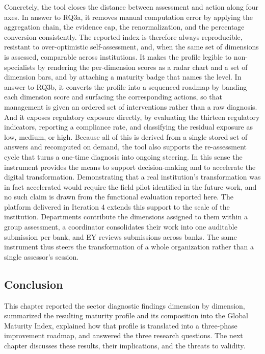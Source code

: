 Concretely, the tool closes the distance between assessment and action along four axes. In answer to RQ3a, it removes manual computation error by applying the aggregation chain, the evidence cap, the renormalization, and the percentage conversion consistently. The reported index is therefore always reproducible, resistant to over-optimistic self-assessment, and, when the same set of dimensions is assessed, comparable across institutions. It makes the profile legible to non-specialists by rendering the per-dimension scores as a radar chart and a set of dimension bars, and by attaching a maturity badge that names the level. In answer to RQ3b, it converts the profile into a sequenced roadmap by banding each dimension score and surfacing the corresponding actions, so that management is given an ordered set of interventions rather than a raw diagnosis. And it exposes regulatory exposure directly, by evaluating the thirteen regulatory indicators, reporting a compliance rate, and classifying the residual exposure as low, medium, or high. Because all of this is derived from a single stored set of answers and recomputed on demand, the tool also supports the re-assessment cycle that turns a one-time diagnosis into ongoing steering. In this sense the instrument provides the means to support decision-making and to accelerate the digital transformation. Demonstrating that a real institution's transformation was in fact accelerated would require the field pilot identified in the future work, and no such claim is drawn from the functional evaluation reported here. The platform delivered in Iteration 4 extends this support to the scale of the institution. Departments contribute the dimensions assigned to them within a group assessment, a coordinator consolidates their work into one auditable submission per bank, and EY reviews submissions across banks. The same instrument thus steers the transformation of a whole organization rather than a single assessor's session.

\subsection{Conclusion}

This chapter reported the sector diagnostic findings dimension by dimension, summarized the resulting maturity profile and its composition into the Global Maturity Index, explained how that profile is translated into a three-phase improvement roadmap, and answered the three research questions. The next chapter discusses these results, their implications, and the threats to validity.

